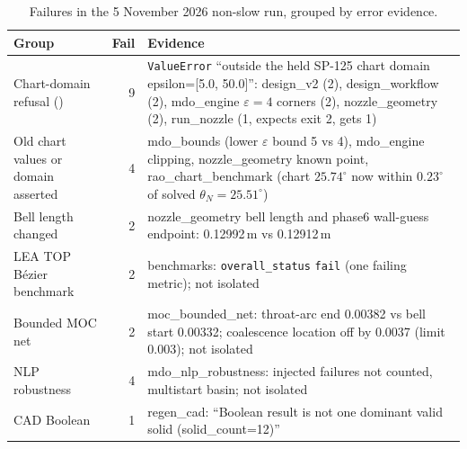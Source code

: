 \begin{table}[H]
\centering\footnotesize
\begin{tabularx}{\linewidth}{P{5.3cm}rY}
\toprule
Group & Fail & Evidence \\
\midrule
Chart-domain refusal () & 9 & \texttt{ValueError} ``outside the held SP-125 chart domain epsilon=[5.0, 50.0]'': design\_v2 (2), design\_workflow (2), mdo\_engine $\varepsilon=4$ corners (2), nozzle\_geometry (2), run\_nozzle (1, expects exit 2, gets 1) \\
Old chart values or domain asserted & 4 & mdo\_bounds (lower $\varepsilon$ bound 5 vs 4), mdo\_engine clipping, nozzle\_geometry known point, rao\_chart\_benchmark (chart $25.74^\circ$ now within $0.23^\circ$ of solved $\theta_N=25.51^\circ$) \\
Bell length changed & 2 & nozzle\_geometry bell length and phase6 wall-guess endpoint: 0.12992\,m vs 0.12912\,m \\
LEA TOP B\'ezier benchmark & 2 & benchmarks: \texttt{overall\_status} \texttt{fail} (one failing metric); not isolated \\
Bounded MOC net & 2 & moc\_bounded\_net: throat-arc end 0.00382 vs bell start 0.00332; coalescence location off by 0.0037 (limit 0.003); not isolated \\
NLP robustness & 4 & mdo\_nlp\_robustness: injected failures not counted, multistart basin; not isolated \\
CAD Boolean & 1 & regen\_cad: ``Boolean result is not one dominant valid solid (solid\_count=12)'' \\
\bottomrule
\end{tabularx}
\caption{Failures in the 5 November 2026 non-slow run, grouped by error evidence.}\label{tab:x07-failures}
\end{table}


